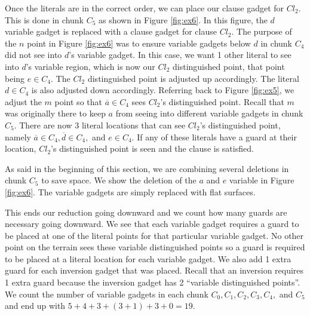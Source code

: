 \documentclass[11pt]{article}
\begin{document}
Once the literals are in the correct order, we can place our clause gadget for $Cl_2$.  This is done in chunk $C_5$ as shown in Figure \ref{fig:ex6}.  In this figure, the $d$ variable gadget is replaced with a clause gadget for clause $Cl_2$.  The purpose of the $n$ point in Figure \ref{fig:ex6} was to ensure variable gadgets below $d$ in chunk $C_4$ did not see into $d$'s variable gadget.  In this case, we want 1 other literal to see into $d$'s variable region, which is now our $Cl_2$ distinguished point, that point being $e \in C_4$.  The $Cl_2$ distinguished point is adjusted up accordingly.  The literal $d \in C_4$ is also adjusted down accordingly.  Referring back to Figure \ref{fig:ex5}, we adjust the $m$ point so that $\overline{a} \in C_4$ sees $Cl_2$'s distinguished point.  Recall that $m$ was originally there to keep $a$ from seeing into different variable gadgets in chunk $C_5$.  There are now 3 literal locations that can see $Cl_2$'s distinguished point, namely $\overline{a} \in C_4, \overline{d} \in C_4,$ and $e \in C_4$.  If any of these literals have a guard at their location, $Cl_2$'s distinguished point is seen and the clause is satisfied.

As said in the beginning of this section, we are combining several deletions in chunk $C_5$ to save space.  We show the deletion of the $a$ and $e$ variable in Figure \ref{fig:ex6}.  The variable gadgets are simply replaced with flat surfaces.

This ends our reduction going downward and we count how many guards are necessary going downward.  We see that each variable gadget requires a guard to be placed at one of the literal points for that particular variable gadget.  No other point on the terrain sees these variable distinguished points so a guard is required to be placed at a literal location for each variable gadget.  We also add 1 extra guard for each inversion gadget that was placed.  Recall that an inversion requires 1 extra guard because the inversion gadget has 2 ``variable distinguished points''.  We count the number of variable gadgets in each chunk $C_0, C_1, C_2, C_3, C_4,$ and $C_5$ and end up with $5+4+3+(3+1)+3+0 = 19$.
\end{document}
